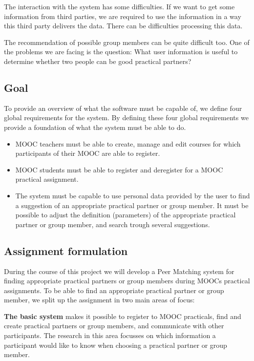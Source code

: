 \documentclass[]{article}
\begin{document}
The interaction with the system has some difficulties.
If we want to get some information from third parties, we are required to use the information in a way this third party delivers the data.
There can be difficulties processing this data.
  
The recommendation of possible group members can be quite difficult too.
One of the problems we are facing is the question: What user information is useful to determine whether two people can be good practical partners?

\subsection{Goal}
To provide an overview of what the software must be capable of, we define four global requirements for the system.
By defining these four global requirements we provide a foundation of what the system must be able to do.
\begin{itemize}
\item MOOC teachers must be able to create, manage and edit courses for which participants of their MOOC are able to register.

\item MOOC students must be able to register and deregister for a MOOC practical assignment.

\item The system must be capable to use personal data provided by the user to find a suggestion of an appropriate practical partner or group member.
It must be possible to adjust the definition (parameters) of the appropriate practical partner or group member, and search trough several suggestions.
\end{itemize}

\subsection{Assignment formulation}
During the course of this project we will develop a Peer Matching system for finding appropriate practical partners or group members during MOOCs practical assignments.
To be able to find an appropriate practical partner or group member, we split up the assignment in two main areas of focus:

\textbf{The basic system} makes it possible to register to MOOC practicals, find and create practical partners or group members, and communicate with other participants.
The research in this area focusses on which information a participant would like to know when choosing a practical partner or group member.
\end{document}
